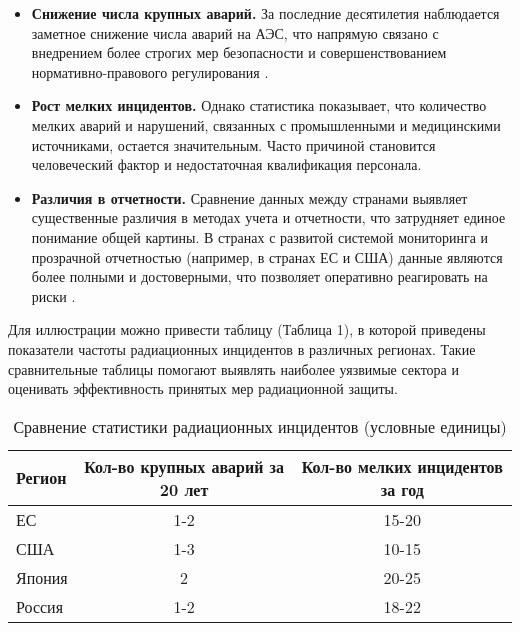 \documentclass[a4paper, 14pt]{extarticle}
\begin{document}
\begin{itemize}
    \item \textbf{Снижение числа крупных аварий.} За последние десятилетия наблюдается заметное снижение числа аварий на АЭС, что напрямую связано с внедрением более строгих мер безопасности и совершенствованием нормативно-правового регулирования \cite{2,4}.

    \item \textbf{Рост мелких инцидентов.} Однако статистика показывает, что количество мелких аварий и нарушений, связанных с промышленными и медицинскими источниками, остается значительным. Часто причиной становится человеческий фактор и недостаточная квалификация персонала.

    \item \textbf{Различия в отчетности.} Сравнение данных между странами выявляет существенные различия в методах учета и отчетности, что затрудняет единое понимание общей картины. В странах с развитой системой мониторинга и прозрачной отчетностью (например, в странах ЕС и США) данные являются более полными и достоверными, что позволяет оперативно реагировать на риски \cite{11,12}.
\end{itemize}

Для иллюстрации можно привести таблицу (Таблица 1), в которой приведены показатели частоты радиационных инцидентов в различных регионах. Такие сравнительные таблицы помогают выявлять наиболее уязвимые сектора и оценивать эффективность принятых мер радиационной защиты.

\begin{table}[h]
    \centering
    \caption{Сравнение статистики радиационных инцидентов (условные единицы)}
    \begin{tabular}{|l|c|c|}
        \hline
        Регион & Кол-во крупных аварий за 20 лет & Кол-во мелких инцидентов за год \\
        \hline
        ЕС     & 1-2                             & 15-20                           \\
        США    & 1-3                             & 10-15                           \\
        Япония & 2                               & 20-25                           \\
        Россия & 1-2                             & 18-22                           \\
        \hline
    \end{tabular}
\end{table}
\end{document}
